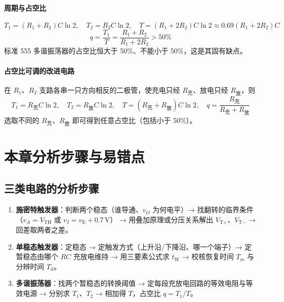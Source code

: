 \paragraph{周期与占空比}
\[
T_1=(R_1+R_2)C\ln2,\quad T_2=R_2C\ln2,\quad
T=(R_1+2R_2)C\ln2\approx0.69(R_1+2R_2)C
\]
\[
q=\frac{T_1}{T}=\frac{R_1+R_2}{R_1+2R_2}>50\%
\]
标准 555 多谐振荡器的占空比恒大于 50\%、不能小于 50\%，这是其固有缺点。

\paragraph{占空比可调的改进电路}
在 $R_1$、$R_2$ 支路各串一只方向相反的二极管，使充电只经 $R_\text{充}$、放电只经 $R_\text{放}$，则
\[
T_1=R_\text{充}C\ln2,\quad T_2=R_\text{放}C\ln2,\quad
T=(R_\text{充}+R_\text{放})C\ln2,\quad q=\frac{R_\text{充}}{R_\text{充}+R_\text{放}}
\]
选取不同的 $R_\text{充}$、$R_\text{放}$ 即可得到任意占空比（包括小于 50\%）。

\section{本章分析步骤与易错点}
\subsection{三类电路的分析步骤}
\begin{enumerate}
    \item \textbf{施密特触发器}：判断两个稳态（谁导通、$v_O$ 为何电平）→ 找翻转的临界条件（$v_A=V_\text{TH}$ 或 $v_I=v_\text{E}+0.7\,\mathrm{V}$）
    → 用叠加原理或分压关系解出 $V_{\text{T}+}$、$V_{\text{T}-}$ → 回差取两者之差。
    \item \textbf{单稳态触发器}：定稳态 → 定触发方式（上升沿/下降沿、哪一个端子）→ 定暂稳态由哪个 $RC$ 充放电维持
    → 用三要素公式求 $t_\text{W}$ → 校核恢复时间 $T_\text{re}$ 与分辨时间 $T_\text{d}$。
    \item \textbf{多谐振荡器}：找两个暂稳态的转换阈值 → 定每段充放电回路的等效电阻与等效电源 → 分别求 $T_1$、$T_2$
    → 相加得 $T$，占空比 $q=T_1/T$。
\end{enumerate}

